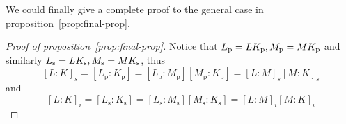\documentclass[a4paper]{article}
\theoremstyle{remark}
\theoremstyle{definition}
\theoremstyle{definition}
\theoremstyle{plain}
\begin{document}
  We could finally give a complete proof to the general case in proposition~\ref{prop:final-prop}.

  \begin{proof}[Proof of proposition~\ref{prop:final-prop}]
    Notice that $L_\mathrm{p} = L K_\mathrm{p}, M_\mathrm{p} = M K_\mathrm{p}$ and similarly
    $L_\mathrm{s} = L K_\mathrm{s}, M_\mathrm{s} = M K_\mathrm{s}$, thus
    \[ [L: K]_s = [L_\mathrm{p}: K_\mathrm{p}] = 
      [L_\mathrm{p}: M_\mathrm{p}][M_\mathrm{p}: K_\mathrm{p}] = [L: M]_s [M: K]_s \]
    and
    \[ [L: K]_i = [L_\mathrm{s}: K_\mathrm{s}] = 
      [L_\mathrm{s}: M_\mathrm{s}][M_\mathrm{s}: K_\mathrm{s}] = [L: M]_i [M: K]_i \]
  \end{proof}
\end{document}
